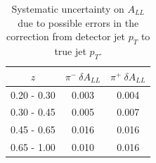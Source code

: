 \begin{table}
  \centering
  \begin{tabular}{|c||c|c|}
    \hline
    $z$ & $\pi^-~\delta A_{LL}$ & $\pi^+~\delta A_{LL}$ \\
    \hline
    0.20 - 0.30 & 0.003 &  0.004 \\
    0.30 - 0.45 & 0.005 &  0.007 \\
    0.45 - 0.65 & 0.016 &  0.016 \\
    0.65 - 1.00 & 0.010 &  0.016 \\
    \hline
  \end{tabular}
  \caption{Systematic uncertainty on $A_{LL}$ due to possible errors in the correction from detector jet $p_T$ to true jet $p_T$.}
  \label{tab:syst-pt-shift}
\end{table}
